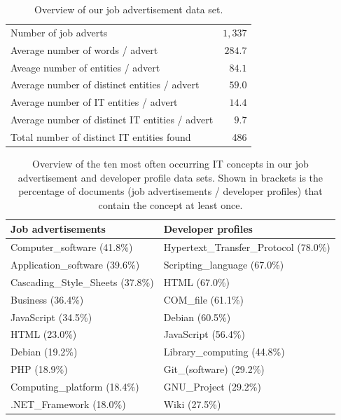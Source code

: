 \documentclass[conference]{IEEEtran}
\begin{document}
\begin{table}
\centering
\begin{tabular}{lr}
\toprule
Number of job adverts								& $1,337$\\
Average number of words / advert 			& $284.7$\\
\midrule
Aveage number of entities / advert			& $84.1$\\
Average number of  distinct entities / advert	& $59.0$\\
\midrule
Average number of IT entities / advert	& $14.4$\\
Average number of distinct IT entities / advert& $9.7$\\
\midrule
Total number of distinct IT entities found	& 486\\
\bottomrule
\end{tabular}
\caption{Overview of our job advertisement data set.}
\label{tab:jobadverts}
\end{table}

\begin{table}
\centering
\footnotesize
\begin{tabular}{ll}
\toprule
\textbf{Job advertisements}	& \textbf{Developer profiles}\\
\midrule
Computer\_software (41.8\%) 			& Hypertext\_Transfer\_Protocol (78.0\%) \\
Application\_software (39.6\%)		& Scripting\_language (67.0\%) \\
Cascading\_Style\_Sheets (37.8\%)	& HTML (67.0\%) \\
Business (36.4\%)								& COM\_file (61.1\%)\\
JavaScript (34.5\%)							& Debian (60.5\%)\\
HTML (23.0\%)									& JavaScript (56.4\%) \\
Debian (19.2\%)								& Library\_computing (44.8\%) \\
PHP (18.9\%)									& Git\_(software) (29.2\%) \\
Computing\_platform (18.4\%)		& GNU\_Project (29.2\%) \\
.NET\_Framework (18.0\%)				& Wiki (27.5\%)\\
\bottomrule
\end{tabular}
\caption{Overview of the ten most often occurring IT concepts in our job advertisement and developer profile data sets. Shown in brackets is the percentage of documents (job advertisements / developer profiles) that contain the concept at least once.}
\label{tab:top10}
\end{table}
\end{document}
